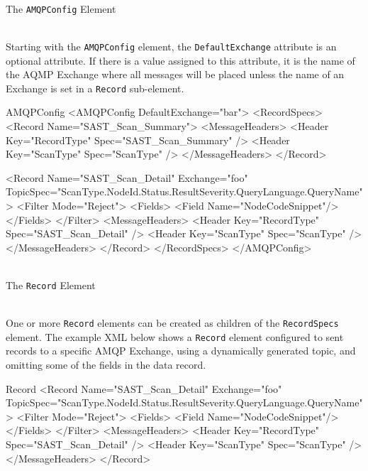 \par{\noindent\\The \texttt{AMQPConfig} Element}

\noindent\\Starting with the \texttt{AMQPConfig} element, the \texttt{DefaultExchange} attribute is an optional attribute.  If there is a value assigned to this attribute,
it is the name of the AQMP Exchange where all messages will be placed unless the name of an Exchange is set in a \texttt{Record} sub-element.



\begin{xml}{AMQPConfig}{\expandsenv\contentvariables}{}
<AMQPConfig DefaultExchange="bar">
    <RecordSpecs>
        <Record Name="SAST_Scan_Summary">
            <MessageHeaders>
                <Header Key="RecordType" Spec="SAST_Scan_Summary" />
                <Header Key="ScanType" Spec="{ScanType}" />
            </MessageHeaders> 
        </Record>

        <Record 
            Name="SAST_Scan_Detail" 
            Exchange="foo" 
            TopicSpec="{ScanType}.{NodeId}.{Status}.{ResultSeverity}.{QueryLanguage}.{QueryName}">
            <Filter Mode="Reject">
                <Fields>
                    <Field Name="NodeCodeSnippet"/>
                </Fields>
            </Filter>
            <MessageHeaders>
                <Header Key="RecordType" Spec="SAST_Scan_Detail" />
                <Header Key="ScanType" Spec="{ScanType}" />
            </MessageHeaders> 
        </Record>
    </RecordSpecs>
</AMQPConfig>
\end{xml}
    


\par{\noindent\\The \texttt{Record} Element}

\noindent\\One or more \texttt{Record} elements can be created as children of the \texttt{RecordSpecs} element.  The example XML below shows a \texttt{Record}
element configured to sent records to a specific AMQP Exchange, using a dynamically generated topic, and omitting some of the fields in the data record.


\begin{xml}{Record}{\expandsenv\contentvariables}{}
<Record 
    Name="SAST_Scan_Detail" 
    Exchange="foo" 
    TopicSpec="{ScanType}.{NodeId}.{Status}.{ResultSeverity}.{QueryLanguage}.{QueryName}">
    <Filter Mode="Reject">
        <Fields>
            <Field Name="NodeCodeSnippet"/>
        </Fields>
    </Filter>
    <MessageHeaders>
        <Header Key="RecordType" Spec="SAST_Scan_Detail" />
        <Header Key="ScanType" Spec="{ScanType}" />
    </MessageHeaders> 
</Record>
\end{xml}



